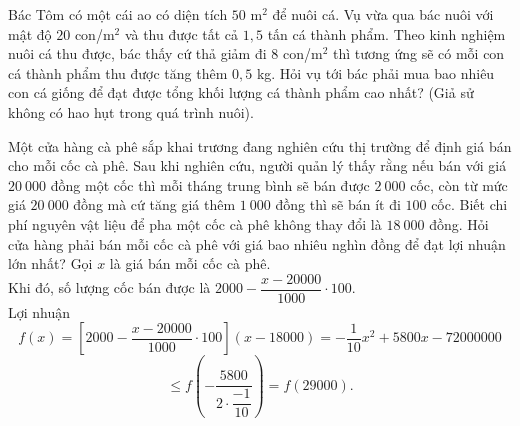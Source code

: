\begin{ex}%
Bác Tôm có một cái ao có diện tích $50$ m$^2$ để nuôi cá. Vụ vừa qua bác nuôi với mật độ $20$ con/m$^2$ và thu được tất cả $1{,}5$ tấn cá thành phẩm. Theo kinh nghiệm nuôi cá thu được, bác thấy cứ thả giảm đi $8 $ con/m$^2$ thì tương ứng sẽ có mỗi con cá thành phẩm thu được tăng thêm $0{,}5$ kg. Hỏi vụ tới bác phải mua bao nhiêu con cá giống để đạt được tổng khối lượng cá thành phẩm cao nhất? (Giả sử không có hao hụt trong quá trình nuôi).
\end{ex}

\begin{ex}%
 Một cửa hàng cà phê sắp khai trương đang nghiên cứu thị trường để định giá bán cho mỗi cốc cà phê. Sau khi nghiên cứu, người quản lý thấy rằng nếu bán với giá $20\ 000$ đồng một cốc thì mỗi tháng trung bình sẽ bán được $2\ 000$ cốc, còn từ mức giá $20\ 000$ đồng mà cứ tăng giá thêm $1\ 000$ đồng thì sẽ bán ít đi $100$ cốc. Biết chi phí nguyên vật liệu để pha một cốc cà phê không thay đổi là $18\ 000$ đồng. Hỏi cửa hàng phải bán mỗi cốc cà phê với giá bao nhiêu nghìn đồng để đạt lợi nhuận lớn nhất?
 \loigiai
  {
  Gọi $x$ là giá bán mỗi cốc cà phê.\\
  Khi đó, số lượng cốc bán được là $2000-\dfrac{x-20000}{1000}\cdot 100.$\\
  Lợi nhuận $$f(x)=\left[2000-\dfrac{x-20000}{1000}\cdot 100 \right]\left(x-18000\right)=-\dfrac{1}{10}x^2+5800x-72000000$$
  $$\le f\left(-\dfrac{5800}{2\cdot \dfrac{-1}{10}}   \right)=f(29000).$$
  }
\end{ex}

